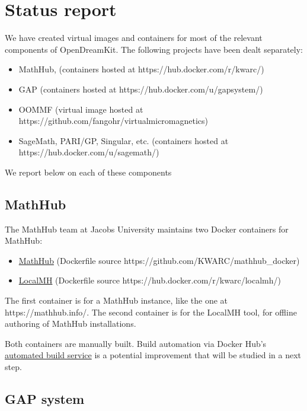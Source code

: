 \section{Status report}\label{status-report}

We have created virtual images and containers for most of the relevant
components of OpenDreamKit. The following projects have been dealt
separately:

\begin{itemize}
\tightlist
\item
  MathHub, (containers hosted at https://hub.docker.com/r/kwarc/)
\item
  GAP (containers hosted at https://hub.docker.com/u/gapsystem/)
\item
  OOMMF (virtual image hosted at
  https://github.com/fangohr/virtualmicromagnetics)
\item
  SageMath, PARI/GP, Singular, etc. (containers hosted at
  https://hub.docker.com/u/sagemath/)
\end{itemize}

We report below on each of these components

\subsection{MathHub}\label{mathhub}

The MathHub team at Jacobs University maintains two Docker containers
for MathHub:

\begin{itemize}
\tightlist
\item
  \href{https://hub.docker.com/r/kwarc/mathhub/}{MathHub} (Dockerfile
  source https://github.com/KWARC/mathhub\_docker)
\item
  \href{https://hub.docker.com/r/kwarc/localmh/}{LocalMH} (Dockerfile
  source https://hub.docker.com/r/kwarc/localmh/)
\end{itemize}

The first container is for a MathHub instance, like the one at
https://mathhub.info/. The second container is for the LocalMH tool, for
offline authoring of MathHub installations.

Both containers are manually built. Build automation via Docker Hub's
\href{https://docs.docker.com/docker-hub/builds/}{automated build
service} is a potential improvement that will be studied in a next step.

\subsection{GAP system}\label{gap-system}

